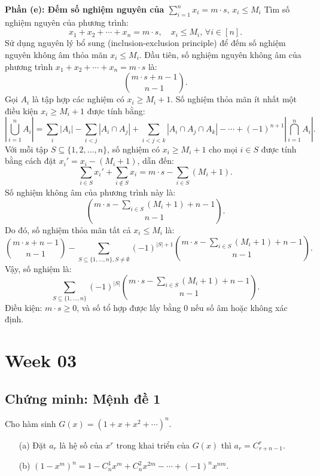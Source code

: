 \documentclass[a4paper,12pt]{article}
\begin{document}
\textbf{Phần (e): Đếm số nghiệm nguyên của \(\sum_{i=1}^{n} x_i = m \cdot s, \, x_i \leq M_i\)}
Tìm số nghiệm nguyên của phương trình:
\[
x_1 + x_2 + \cdots + x_n = m \cdot s, \quad x_i \leq M_i, \, \forall i \in [n].
\]
Sử dụng nguyên lý bổ sung (inclusion-exclusion principle) để đếm số nghiệm nguyên không âm thỏa mãn \( x_i \leq M_i \). Đầu tiên, số nghiệm nguyên không âm của phương trình \( x_1 + x_2 + \cdots + x_n = m \cdot s \) là:
\[
\binom{m \cdot s + n - 1}{n - 1}.
\]
Gọi \( A_i \) là tập hợp các nghiệm có \( x_i \geq M_i + 1 \). Số nghiệm thỏa mãn ít nhất một điều kiện \( x_i \geq M_i + 1 \) được tính bằng:
\[
\left| \bigcup_{i=1}^n A_i \right| = \sum_{i} |A_i| - \sum_{i < j} |A_i \cap A_j| + \sum_{i < j < k} |A_i \cap A_j \cap A_k| - \cdots + (-1)^{n+1} \left| \bigcap_{i=1}^n A_i \right|.
\]
Với mỗi tập \( S \subseteq \{1, 2, \ldots, n\} \), số nghiệm có \( x_i \geq M_i + 1 \) cho mọi \( i \in S \) được tính bằng cách đặt \( x_i' = x_i - (M_i + 1) \), dẫn đến:
\[
\sum_{i \in S} x_i' + \sum_{i \notin S} x_i = m \cdot s - \sum_{i \in S} (M_i + 1).
\]
Số nghiệm không âm của phương trình này là:
\[
\binom{m \cdot s - \sum_{i \in S} (M_i + 1) + n - 1}{n - 1}.
\]
Do đó, số nghiệm thỏa mãn tất cả \( x_i \leq M_i \) là:
\[
\binom{m \cdot s + n - 1}{n - 1} - \sum_{S \subseteq \{1, \ldots, n\}, S \neq \emptyset} (-1)^{|S|+1} \binom{m \cdot s - \sum_{i \in S} (M_i + 1) + n - 1}{n - 1}.
\]
Vậy, số nghiệm là:
\[
\boxed{\sum_{S \subseteq \{1, \ldots, n\}} (-1)^{|S|} \binom{m \cdot s - \sum_{i \in S} (M_i + 1) + n - 1}{n - 1}}.
\]
Điều kiện: \( m \cdot s \geq 0 \), và số tổ hợp được lấy bằng 0 nếu số âm hoặc không xác định.

\section*{Week 03}

\subsection*{Chứng minh: Mệnh đề 1}

Cho hàm sinh \( G(x) = (1 + x + x^2 + \cdots)^n \).

\begin{enumerate}
    \item[(a)] Đặt \( a_r \) là hệ số của \( x^r \) trong khai triển của \( G(x) \) thì \( a_r = C_{r+n-1}^{r} \).
    \item[(b)] \( (1 - x^m)^n = 1 - C_n^1 x^m + C_n^2 x^{2m} - \cdots + (-1)^n x^{nm} \).
\end{enumerate}
\end{document}
